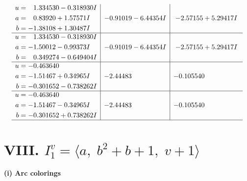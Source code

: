 \documentclass[1p]{elsarticle_modified}
\theoremstyle{definition}
\begin{document}
$$\begin{array}{c|c|c}
\begin{aligned}
u &= \phantom{-}1.334530 - 0.318930 I \\
a &= \phantom{-}0.83920 + 1.57571 I \\
b &= -1.38108 + 1.30487 I\end{aligned}
 & -0.91019 - 6.44354 I & -2.57155 + 5.29417 I \\ \hline\begin{aligned}
u &= \phantom{-}1.334530 - 0.318930 I \\
a &= -1.50012 - 0.99373 I \\
b &= \phantom{-}0.349274 - 0.649404 I\end{aligned}
 & -0.91019 - 6.44354 I & -2.57155 + 5.29417 I \\ \hline\begin{aligned}
u &= -0.463640\phantom{ +0.000000I} \\
a &= -1.51467 + 0.34965 I \\
b &= -0.301652 - 0.738262 I\end{aligned}
 & -2.44483\phantom{ +0.000000I} & -0.105540\phantom{ +0.000000I} \\ \hline\begin{aligned}
u &= -0.463640\phantom{ +0.000000I} \\
a &= -1.51467 - 0.34965 I \\
b &= -0.301652 + 0.738262 I\end{aligned}
 & -2.44483\phantom{ +0.000000I} & -0.105540\phantom{ +0.000000I}\\
 \hline 
 \end{array}$$\newpage\newpage\renewcommand{\arraystretch}{1}
\centering \section*{VIII. $I^v_{1}= \langle a,\;b^2+b+1,\;v+1 \rangle$}
\flushleft \textbf{(i) Arc colorings}\\
\end{document}
